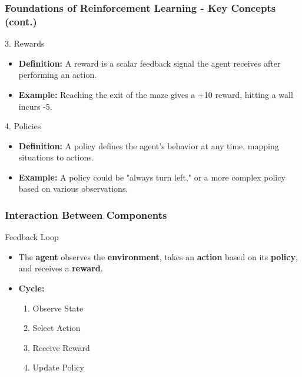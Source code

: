 \documentclass[aspectratio=169]{beamer}
\begin{document}
\begin{frame}[fragile]
    \frametitle{Foundations of Reinforcement Learning - Key Concepts (cont.)}
    \begin{block}{3. Rewards}
        \begin{itemize}
            \item \textbf{Definition:} A reward is a scalar feedback signal the agent receives after performing an action.
            \item \textbf{Example:} Reaching the exit of the maze gives a +10 reward, hitting a wall incurs -5.
        \end{itemize}
    \end{block}

    \begin{block}{4. Policies}
        \begin{itemize}
            \item \textbf{Definition:} A policy defines the agent's behavior at any time, mapping situations to actions.
            \item \textbf{Example:} A policy could be "always turn left," or a more complex policy based on various observations.
        \end{itemize}
    \end{block}
\end{frame}

\begin{frame}[fragile]
    \frametitle{Interaction Between Components}
    \begin{block}{Feedback Loop}
        \begin{itemize}
            \item The \textbf{agent} observes the \textbf{environment}, takes an \textbf{action} based on its \textbf{policy}, and receives a \textbf{reward}.
            \item \textbf{Cycle:}
            \begin{enumerate}
                \item Observe State
                \item Select Action
                \item Receive Reward
                \item Update Policy
            \end{enumerate}
        \end{itemize}
    \end{block}
\end{frame}
\end{document}
